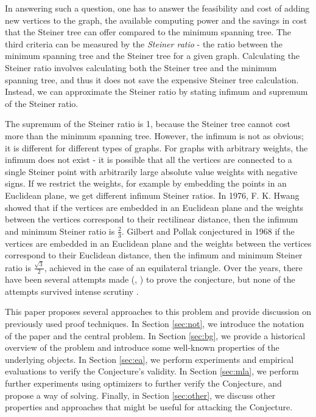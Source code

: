 \documentclass{mpaper}
\begin{document}
 In answering such a question, one has to answer the feasibility and cost of adding new vertices to the graph, the available computing power and the savings in cost that the Steiner tree can offer compared to the minimum spanning tree. The third criteria can be measured by the \emph{Steiner ratio} - the ratio between the minimum spanning tree and the Steiner tree for a given graph. Calculating the Steiner ratio involves calculating both the Steiner tree and the minimum spanning tree, and thus it does not save the expensive Steiner tree calculation. Instead, we can approximate the Steiner ratio by stating infimum and supremum of the Steiner ratio.
 
The supremum of the Steiner ratio is 1, because the Steiner tree cannot cost more than the minimum spanning tree. However, the infimum is not as obvious; it is different for different types of graphs. For graphs with arbitrary weights, the infimum does not exist - it is possible that all the vertices are connected to a single Steiner point with arbitrarily large absolute value weights with negative signs. If we restrict the weights, for example by embedding the points in an Euclidean plane, we get different infimum Steiner ratios. In 1976, F. K. Hwang \cite{doi:10.1137/0130013} showed that if the vertices are embedded in an Euclidean plane and the weights between the vertices correspond to their rectilinear distance, then the infimum and minimum Steiner ratio is $\frac{2}{3}$. Gilbert and Pollak conjectured in 1968 \cite{GP1968} if the vertices are embedded in an Euclidean plane and the weights between the vertices correspond to their Euclidean distance, then the infimum and minimum Steiner ratio is $\frac{\sqrt{3}}{2}$, achieved in the case of an equilateral triangle. Over the years, there have been several attempts made (\cite{doi:10.1073/pnas.87.23.9464}, \cite{myue}) to prove the conjecture, but none of the attempts survived intense scrutiny \cite{Ivanov2012}. 

This paper proposes several approaches to this problem and provide discussion on previously used proof techniques. In Section \ref{sec:not}, we introduce the notation of the paper and the central problem. In Section \ref{sec:bg}, we provide a historical overview of the problem and introduce some well-known properties of the underlying objects.
In Section \ref{sec:ea}, we perform experiments and empirical evaluations to verify the Conjecture's validity. In Section \ref{sec:mla}, we perform further experiments using optimizers to further verify the Conjecture, and propose a way of solving. Finally, in Section \ref{sec:other}, we discuss other properties and approaches that might be useful for attacking the Conjecture.
\end{document}
